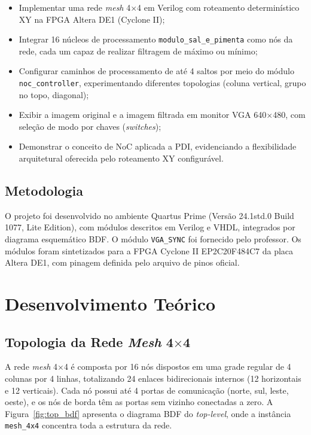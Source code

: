 \documentclass[12pt, a4paper]{article}
\begin{document}
	\begin{itemize}
		\item Implementar uma rede \textit{mesh} 4$\times$4 em Verilog com
		roteamento determinístico XY na FPGA Altera DE1 (Cyclone II);
		\item Integrar 16 núcleos de processamento \texttt{modulo\_sal\_e\_pimenta}
		como nós da rede, cada um capaz de realizar filtragem de máximo ou mínimo;
		\item Configurar caminhos de processamento de até 4 saltos por meio do
		módulo \texttt{noc\_controller}, experimentando diferentes topologias
		(coluna vertical, grupo no topo, diagonal);
		\item Exibir a imagem original e a imagem filtrada em monitor VGA
		640$\times$480, com seleção de modo por chaves (\textit{switches});
		\item Demonstrar o conceito de NoC aplicada a PDI, evidenciando a
		flexibilidade arquitetural oferecida pelo roteamento XY configurável.
	\end{itemize}
	
	\subsection{Metodologia}
	
	O projeto foi desenvolvido no ambiente Quartus Prime (Versão 24.1std.0 Build
	1077, Lite Edition), com módulos descritos em Verilog e VHDL, integrados por
	diagrama esquemático BDF. O módulo \texttt{VGA\_SYNC} foi fornecido pelo
	professor. Os módulos foram sintetizados para a FPGA Cyclone II EP2C20F484C7
	da placa Altera DE1, com pinagem definida pelo arquivo de pinos oficial.
	
	\section{Desenvolvimento Teórico}
	
	\subsection{Topologia da Rede \textit{Mesh} 4$\times$4}
	
	A rede \textit{mesh} 4$\times$4 é composta por 16 nós dispostos em uma grade
	regular de 4 colunas por 4 linhas, totalizando 24 enlaces bidirecionais
	internos (12 horizontais e 12 verticais). Cada nó possui até 4 portas de
	comunicação (norte, sul, leste, oeste), e os nós de borda têm as portas sem
	vizinho conectadas a zero. A Figura~\ref{fig:top_bdf} apresenta o diagrama
	BDF do \textit{top-level}, onde a instância \texttt{mesh\_4x4} concentra toda
	a estrutura da rede.
	
\end{document}

